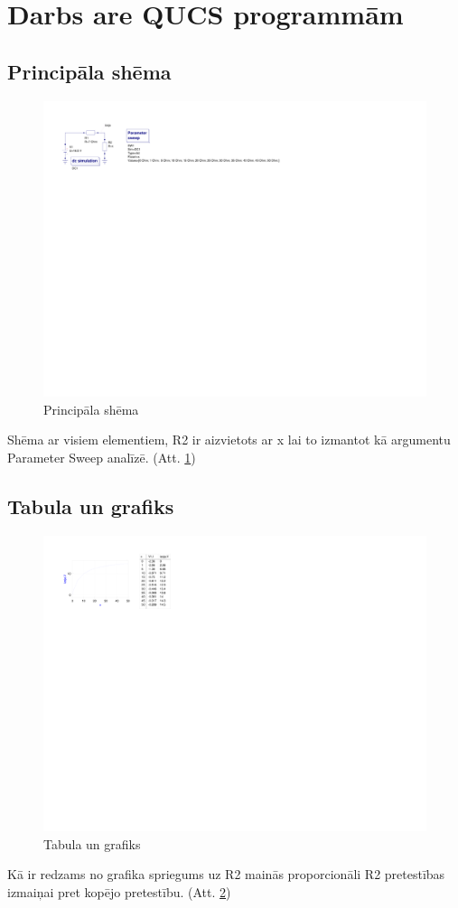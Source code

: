 \documentclass{report}
\begin{document}
\section{Darbs are QUCS programmām}
\subsection{Principāla shēma}
\begin{figure}[!tb]
\includegraphics[width=\textwidth,height=\textheight,keepaspectratio]{02.png}
\caption{Principāla shēma}
\label{Principala shema}
\end{figure}
Shēma ar visiem elementiem, R2 ir aizvietots ar x lai to izmantot kā argumentu Parameter Sweep analīzē. (Att. \ref{Principala shema})
\subsection{Tabula un grafiks}
\begin{figure}[!tb]
\includegraphics[width=\textwidth,height=\textheight,keepaspectratio]{02_tabula_grafiks.png}
\caption{Tabula un grafiks}
\label{Tabula un grafiks}
\end{figure}
Kā ir redzams no grafika spriegums uz R2 mainās proporcionāli R2 pretestības izmaiņai pret kopējo pretestību. (Att. \ref{Tabula un grafiks})
\end{document}
